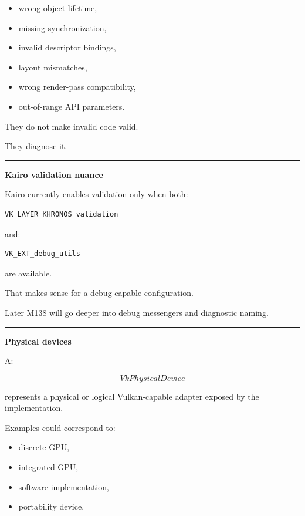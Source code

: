 \begin{itemize}
\tightlist
\item
  wrong object lifetime,
\item
  missing synchronization,
\item
  invalid descriptor bindings,
\item
  layout mismatches,
\item
  wrong render-pass compatibility,
\item
  out-of-range API parameters.
\end{itemize}

They do not make invalid code valid.

They diagnose it.

\begin{center}\rule{0.5\linewidth}{0.5pt}\end{center}

\textbf{Kairo validation nuance}

Kairo currently enables validation only when both:

\begin{verbatim}
VK_LAYER_KHRONOS_validation
\end{verbatim}

and:

\begin{verbatim}
VK_EXT_debug_utils
\end{verbatim}

are available.

That makes sense for a debug-capable configuration.

Later M138 will go deeper into debug messengers and diagnostic naming.

\begin{center}\rule{0.5\linewidth}{0.5pt}\end{center}

\textbf{Physical devices}

A:

\[
VkPhysicalDevice
\]

represents a physical or logical Vulkan-capable adapter exposed by the implementation.

Examples could correspond to:

\begin{itemize}
\tightlist
\item
  discrete GPU,
\item
  integrated GPU,
\item
  software implementation,
\item
  portability device.
\end{itemize}

